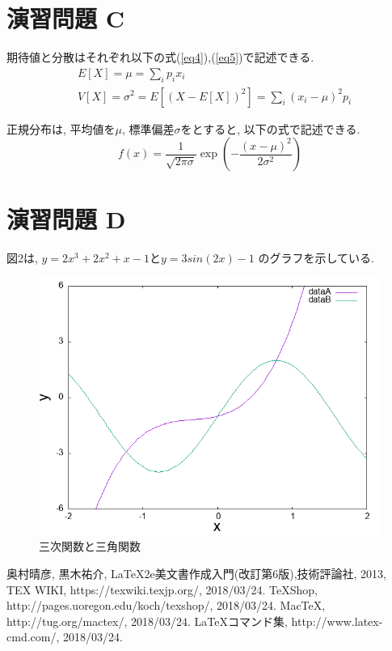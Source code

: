 \documentclass[a4paper, 11pt, titlepage]{jsarticle}
\begin{document}
\section {演習問題 C}
期待値と分散はそれぞれ以下の式(\ref{eq4}),(\ref{eq5})で記述できる.\\

\begin{align}
&E[X] = \mu = \sum _i p_i x_i \label{eq4}\\
&V[X] = \sigma^2 = E[(X - E[X])^2] = \sum _i (x_i - \mu)^2 p_i \label{eq5}
\end{align}

正規分布は, 平均値を$\mu $, 標準偏差$\sigma $をとすると, 以下の式で記述できる.\\
\[
f(x) = \frac{1}{\sqrt{2 \pi \sigma}} \exp{( - \frac{(x - \mu)^2}{2 \sigma ^2})}
\]
\section{演習問題 D}
図2は, $y=2x^3+2x^2+x-1$と$y=3sin(2x)-1$ のグラフを示している.

\begin{figure}[htbp]
    \centering
    \includegraphics[width=120mm]{graph2.png}
    \caption{三次関数と三角関数}
    \label{fig2}
\end{figure}


\begin{thebibliography}{99}
 奥村晴彦, 黒木祐介, \LaTeX 2e美文書作成入門(改訂第6版),技術評論社, 2013,
 TEX WIKI, https://texwiki.texjp.org/, 2018/03/24.
 TeXShop, http://pages.uoregon.edu/koch/texshop/, 2018/03/24.
 MacTeX, http://tug.org/mactex/, 2018/03/24.
 LaTeXコマンド集, http://www.latex-cmd.com/, 2018/03/24.
\end{thebibliography}
\end{document}
